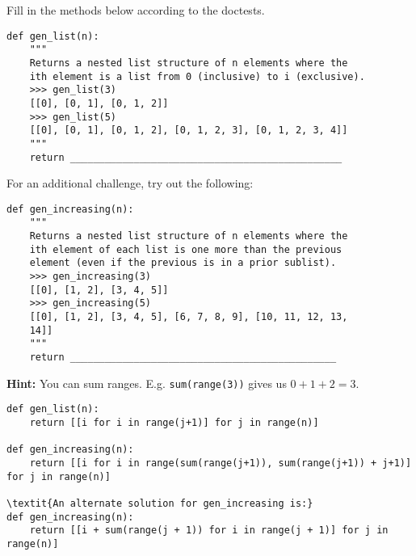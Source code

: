 \begin{blocksection}
\question Fill in the methods below according to the doctests.
\end{blocksection}

\begin{lstlisting}
def gen_list(n):
    """
    Returns a nested list structure of n elements where the 
    ith element is a list from 0 (inclusive) to i (exclusive).
    >>> gen_list(3)
    [[0], [0, 1], [0, 1, 2]]
    >>> gen_list(5)
    [[0], [0, 1], [0, 1, 2], [0, 1, 2, 3], [0, 1, 2, 3, 4]]
    """
    return _______________________________________________
\end{lstlisting}

For an additional challenge, try out the following:

\begin{lstlisting}
def gen_increasing(n):
    """
    Returns a nested list structure of n elements where the 
    ith element of each list is one more than the previous 
    element (even if the previous is in a prior sublist).
    >>> gen_increasing(3)
    [[0], [1, 2], [3, 4, 5]]
    >>> gen_increasing(5)
    [[0], [1, 2], [3, 4, 5], [6, 7, 8, 9], [10, 11, 12, 13, 
    14]]
    """
    return ______________________________________________
\end{lstlisting}

\textbf{Hint:} You can sum ranges. E.g. \texttt{sum(range(3))} gives us $0 + 1 + 2 = 3$.

\begin{solution}
\begin{lstlisting}
def gen_list(n):
    return [[i for i in range(j+1)] for j in range(n)]

def gen_increasing(n):
	return [[i for i in range(sum(range(j+1)), sum(range(j+1)) + j+1)] for j in range(n)]

\textit{An alternate solution for gen_increasing is:}
def gen_increasing(n):
    return [[i + sum(range(j + 1)) for i in range(j + 1)] for j in range(n)]
\end{lstlisting}
\end{solution}